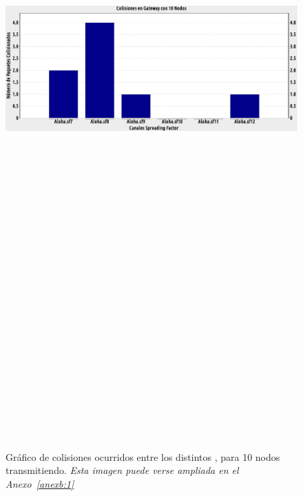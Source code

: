 \begin{justify}
\begin{figure}[!ht]
\centering
\includegraphics[width=13cm,height=30cm,keepaspectratio]{images/colisiones10nodos.eps}
\caption{Gráfico de colisiones ocurridos entre los distintos , para 10 nodos transmitiendo. \textit{Esta imagen puede verse ampliada en el Anexo~\ref{anexb:1}}}
\label{nodos:10}
\end{figure}


\end{justify}
